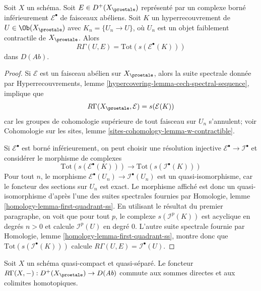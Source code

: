 \begin{lemma}
\label{lemma-compute-cohomology}
Soit $X$ un schéma. Soit $E \in D^+(X_\proetale)$ représenté par
un complexe borné inférieurement $\mathcal{E}^\bullet$ de faisceaux abéliens.
Soit $K$ un hyperrecouvrement de $U \in \Ob(X_\proetale)$ avec
$K_n = \{U_n \to U\}$, où $U_n$ est un objet faiblement contractile de
$X_\proetale$. Alors
$$
R\Gamma(U, E) = \text{Tot}(s(\mathcal{E}^\bullet(K)))
$$
dans $D(\textit{Ab})$.
\end{lemma}

\begin{proof}
Si $\mathcal{E}$ est un faisceau
abélien sur $X_\proetale$, alors la suite spectrale donnée par
Hyperrecouvrements, lemme \ref{hypercovering-lemma-cech-spectral-sequence},
implique que
$$
R\Gamma(X_\proetale, \mathcal{E}) = s(\mathcal{E}(K))
$$
car les groupes de cohomologie supérieure de tout faisceau sur $U_n$ s'annulent; voir
Cohomologie sur les sites, lemme \ref{sites-cohomology-lemma-w-contractible}.

\medskip\noindent
Si $\mathcal{E}^\bullet$ est borné inférieurement, on peut choisir une résolution
injective $\mathcal{E}^\bullet \to \mathcal{I}^\bullet$ et considérer
le morphisme de complexes
$$
\text{Tot}(s(\mathcal{E}^\bullet(K)))
\longrightarrow
\text{Tot}(s(\mathcal{I}^\bullet(K)))
$$
Pour tout $n$, le morphisme $\mathcal{E}^\bullet(U_n) \to \mathcal{I}^\bullet(U_n)$
est un quasi-isomorphisme, car le foncteur des sections sur $U_n$ est exact.
Le morphisme affiché est donc un quasi-isomorphisme d'après l'une des suites
spectrales fournies par
Homologie, lemme \ref{homology-lemma-first-quadrant-ss}.
En utilisant le résultat du premier paragraphe, on voit que pour tout $p$,
le complexe $s(\mathcal{I}^p(K))$ est acyclique en degrés $n > 0$ et
calcule $\mathcal{I}^p(U)$ en degré $0$. L'autre suite
spectrale fournie par
Homologie, lemme \ref{homology-lemma-first-quadrant-ss},
montre donc que $\text{Tot}(s(\mathcal{I}^\bullet(K)))$ calcule
$R\Gamma(U, E) = \mathcal{I}^\bullet(U)$.
\end{proof}

\begin{lemma}
\label{lemma-quasi-compact-quasi-separated-commutes-direct-sums}
Soit $X$ un schéma quasi-compact et quasi-séparé.
Le foncteur $R\Gamma(X, -) : D^+(X_\proetale) \to D(\textit{Ab})$
commute aux sommes directes et aux colimites homotopiques.
\end{lemma}

